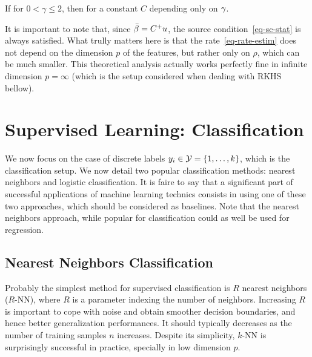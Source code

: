\begin{thm}
	If
	for $0 < \gamma \leq 2$, then 
	for a constant $C$ depending only on $\gamma$.
\end{thm}

It is important to note that, since $\bar{\beta} = C^{+} u$, the source condition~\eqref{eq-sc-stat} is always satisfied. What trully matters here is that the rate~\eqref{eq-rate-estim} does not depend on the dimension $p$ of the features, but rather only on $\rho$, which can be much smaller. This theoretical analysis actually works perfectly fine in infinite dimension $p=\infty$ (which is the setup considered when dealing with RKHS bellow). 


\section{Supervised Learning: Classification}
\label{sec-classif}

We now focus on the case of discrete labels $y_i \in \mathcal{Y} = \{1,\ldots,k\}$, which is the classification setup.
%
We now detail two popular classification methods: nearest neighbors and logistic classification.
%
It is faire to say that a significant part of successful applications of machine learning technics consists in using one of these two approaches, which should be considered as baselines. 
%
Note that the nearest neighbors approach, while popular for classification could as well be used for regression.

\subsection{Nearest Neighbors Classification}
\label{sec-nn-classif}

Probably the simplest method for supervised classification is $R$ nearest neighbors ($R$-NN), where $R$ is a parameter indexing the number of neighbors. Increasing $R$ is important to cope with noise and obtain smoother decision boundaries, and hence better generalization performances. It should typically decreases as the number of training samples $n$ increases.
%
Despite its simplicity, $k$-NN is surprisingly successful in practice, specially in low dimension $p$.


